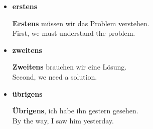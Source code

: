 \documentclass{article}
\begin{document}
            \begin{itemize}
                
                \item \textbf{erstens}
                
                \textbf{Erstens} müssen wir das Problem verstehen.\\
                First, we must understand the problem.
                
                \item \textbf{zweitens}
                
                \textbf{Zweitens} brauchen wir eine Lösung.\\
                Second, we need a solution.
                
                \item \textbf{übrigens}
                
                \textbf{Übrigens}, ich habe ihn gestern gesehen.\\
                By the way, I saw him yesterday.
            
            \end{itemize}
\end{document}
